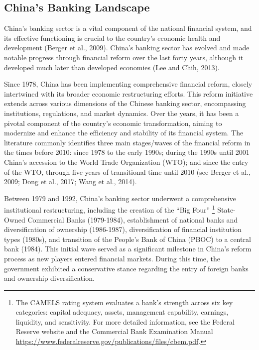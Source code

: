 \documentclass[
  12pt,
  a4paper,
]{scrreprt}
\begin{document}
\subsection{China's Banking Landscape}\label{chinas-banking-landscape}

China's banking sector is a vital component of the national financial
system, and its effective functioning is crucial to the country's
economic health and development (Berger et al., 2009). China's banking
sector has evolved and made notable progress through financial reform
over the last forty years, although it developed much later than
developed economies (Lee and Chih, 2013).

Since 1978, China has been implementing comprehensive financial reform,
closely intertwined with its broader economic restructuring efforts.
This reform initiative extends across various dimensions of the Chinese
banking sector, encompassing institutions, regulations, and market
dynamics. Over the years, it has been a pivotal component of the
country's economic transformation, aiming to modernize and enhance the
efficiency and stability of its financial system. The literature
commonly identifies three main stages/waves of the financial reform in
the times before 2010: since 1978 to the early 1990s; during the 1990s
until 2001 China's accession to the World Trade Organization (WTO); and
since the entry of the WTO, through five years of transitional time
until 2010 (see Berger et al., 2009; Dong et al., 2017; Wang et al.,
2014).

Between 1979 and 1992, China's banking sector underwent a comprehensive
institutional restructuring, including the creation of the ``Big Four''
\footnote{The CAMELS rating system evaluates a bank's strength across
  six key categories: capital adequacy, assets, management capability,
  earnings, liquidity, and sensitivity. For more detailed information,
  see the Federal Reserve website and the Commercial Bank Examination
  Manual
  \url{https://www.federalreserve.gov/publications/files/cbem.pdf}.}
State-Owned Commercial Banks (1979-1984), establishment of national
banks and diversification of ownership (1986-1987), diversification of
financial institution types (1980s), and transition of the People's Bank
of China (PBOC) to a central bank (1984). This initial wave served as a
significant milestone in China's reform process as new players entered
financial markets. During this time, the government exhibited a
conservative stance regarding the entry of foreign banks and ownership
diversification.
\end{document}
